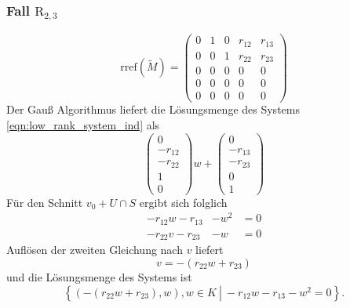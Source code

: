 \documentclass[a4paper,oneside, 11pt, openany%
]{article}
\theoremstyle{custom}
\theoremstyle{custom}
\begin{document}
\subsubsection*{Fall $\text{R}_{2,3}$}
\begin{equation*}\label{eqn:rref_r23}
	\text{rref}(\tilde{M}) =
	\left( \begin{array}{ccccc}
		0&1&0&r_{12}&r_{13}\\
		0&0&1&r_{22}&r_{23}\\
		0&0&0&0&0\\
		0&0&0&0&0\\
		0&0&0&0&0
	\end{array}\right)
\end{equation*}
Der Gauß Algorithmus liefert die Lösungsmenge des Systems \eqref{eqn:low_rank_system_ind} als
\begin{equation*}
	\begin{pmatrix}
		0\\
		-r_{12}\\
		-r_{22}\\
		1\\
		0
	\end{pmatrix}w +
	\begin{pmatrix}
		0\\
		-r_{13}\\
		-r_{23}\\
		0\\
		1
	\end{pmatrix}
\end{equation*}
Für den Schnitt $v_0 + U \cap S $ ergibt sich folglich
\begin{equation*}
	\begin{alignedat}{2}
		-r_{12}w-r_{13}&-w^2&=0\\
		-r_{22}v-r_{23}&-w&=0
	\end{alignedat}
\end{equation*}
Auflösen der zweiten Gleichung nach $v$ liefert
\begin{equation*}
	v=-\left( r_{22}w+r_{23}\right) 
\end{equation*}
und die Lösungsmenge des Systems ist
\begin{equation*}
	\left\lbrace (-\left( r_{22}w+r_{23}\right),w), w \in K \ \left| \ -r_{12}w-r_{13}-w^2=0\right.\right\rbrace .
\end{equation*}
\end{document}

